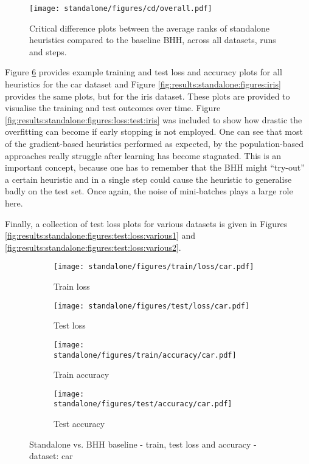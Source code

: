 \begin{figure}[htbp]
	\centering
	\texttt{[image: standalone/figures/cd/overall.pdf]}
	\caption{Critical difference plots between the average ranks of standalone heuristics compared to the baseline \Acs{BHH}, across all datasets, runs and steps.}
	\label{fig:results:standalone:descriptive:cd}
\end{figure}

Figure \ref{fig:results:standalone:figures:car} provides example training and test loss and accuracy plots for all heuristics for the car dataset and Figure \ref{fig:results:standalone:figures:iris} provides the same plots, but for the iris dataset. These plots are provided to visualise the training and test outcomes over time. Figure \ref{fig:results:standalone:figures:loss:test:iris} was included to show how drastic the overfitting can become if early stopping is not employed. One can see that most of the gradient-based heuristics performed as expected, by the population-based approaches really struggle after learning has become stagnated. This is an important concept, because one has to remember that the \Ac{BHH} might ``try-out'' a certain heuristic and in a single step could cause the heuristic to generalise badly on the test set. Once again, the noise of mini-batches plays a large role here.






Finally, a collection of test loss plots for various datasets is given in Figures \ref{fig:results:standalone:figures:test:loss:various1} and \ref{fig:results:standalone:figures:test:loss:various2}.

\begin{figure}[htbp]
	\begin{subfigure}{0.5\textwidth}
		\centering
		\texttt{[image: standalone/figures/train/loss/car.pdf]}
		\caption{Train loss}
		\label{fig:results:standalone:figures:loss:train:car}
	\end{subfigure}
	\begin{subfigure}{0.5\textwidth}
		\centering
		\texttt{[image: standalone/figures/test/loss/car.pdf]}
		\caption{Test loss}
		\label{fig:results:standalone:figures:loss:test:car}
	\end{subfigure}
	\par\bigskip
	\begin{subfigure}{0.5\textwidth}
		\centering
		\texttt{[image: standalone/figures/train/accuracy/car.pdf]}
		\caption{Train accuracy}
		\label{fig:results:standalone:figures:accuracy:train:car}
	\end{subfigure}
	\begin{subfigure}{0.5\textwidth}
		\centering
		\texttt{[image: standalone/figures/test/accuracy/car.pdf]}
		\caption{Test accuracy}
		\label{fig:results:standalone:figures:accuracy:test:car}
	\end{subfigure}
	\par\bigskip
	\caption{Standalone vs. \Acs{BHH} baseline - train, test loss and accuracy - dataset: car}
	\label{fig:results:standalone:figures:car}
\end{figure}

